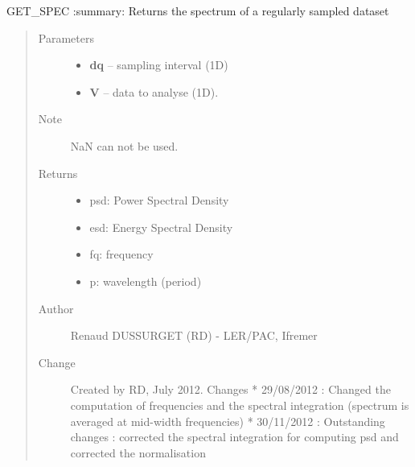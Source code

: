 \documentclass[letterpaper,10pt,english]{sphinxmanual}
\begin{document}
\begin{fulllineitems}
\label{altimetry.tools.spectrum:altimetry.tools.spectrum.get_spec}
GET\_SPEC
:summary: Returns the spectrum of a regularly sampled dataset
\begin{quote}\begin{description}
\item[{Parameters}] \leavevmode\begin{itemize}
\item {} 
\textbf{dq} -- sampling interval (1D)

\item {} 
\textbf{V} -- data to analyse (1D).

\end{itemize}

\item[{Note }] \leavevmode
NaN can not be used.

\item[{Returns}] \leavevmode
\begin{itemize}
\item {} 
psd: Power Spectral Density

\item {} 
esd: Energy Spectral Density

\item {} 
fq: frequency

\item {} 
p: wavelength (period)

\end{itemize}


\item[{Author }] \leavevmode
Renaud DUSSURGET (RD) - LER/PAC, Ifremer

\item[{Change }] \leavevmode
Created by RD, July 2012. Changes
* 29/08/2012 : Changed the computation of frequencies and the spectral integration (spectrum is averaged at mid-width frequencies)
* 30/11/2012 : Outstanding changes : corrected the spectral integration for computing psd and corrected the normalisation

\end{description}\end{quote}

\end{fulllineitems}

\end{document}
